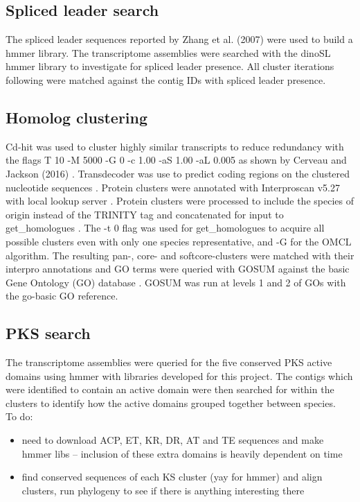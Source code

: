 \documentclass[12pt]{article}
\begin{document}
\subsection*{Spliced leader search}
The spliced leader sequences reported by Zhang et al. (2007) were used to build a hmmer library. 
The transcriptome assemblies were searched with the dinoSL hmmer library to investigate for spliced leader presence. 
All cluster iterations following were matched against the contig IDs with spliced leader presence.

\subsection*{Homolog clustering}
Cd-hit was used to cluster highly similar transcripts to reduce redundancy with the flags T 10 -M 5000 -G 0 -c 1.00 -aS 1.00 -aL 0.005 as shown by Cerveau and Jackson (2016) \cite{cerveau2016combining,fu2012cd}. 
Transdecoder was use to predict coding regions on the clustered nucleotide sequences \cite{haas2016transdecoder}.
Protein clusters were annotated with Interproscan v5.27 with local lookup server \cite{quevillon2005interproscan}.
Protein clusters were processed to include the species of origin instead of the TRINITY tag and concatenated for input to get\_homologues \cite{vinuesa2015robust}. 
The -t 0 flag was used for get\_homologues to acquire all possible clusters even with only one species representative, and -G for the OMCL algorithm. 
The resulting pan-, core- and softcore-clusters were matched with their interpro annotations and GO terms were queried with GOSUM against the basic Gene Ontology (GO) database \cite{timgosum,ashburner2000gene,gene2016expansion}. 
GOSUM was run at levels 1 and 2 of GOs with the go-basic GO reference. 

\subsection*{PKS search}
The transcriptome assemblies were queried for the five conserved PKS active domains using hmmer \cite{eddy2015hmmer} with libraries developed for this project. 
The contigs which were identified to contain an active domain were then searched for within the clusters to identify how the active domains grouped together between species.\\
To do:
\begin{itemize}
\item need to download ACP, ET, KR, DR, AT and TE sequences and make hmmer libs -- inclusion of these extra domains is heavily dependent on time
\item find conserved sequences of each KS cluster (yay for hmmer) and align clusters, run phylogeny to see if there is anything interesting there 
\end{itemize}
\end{document}
